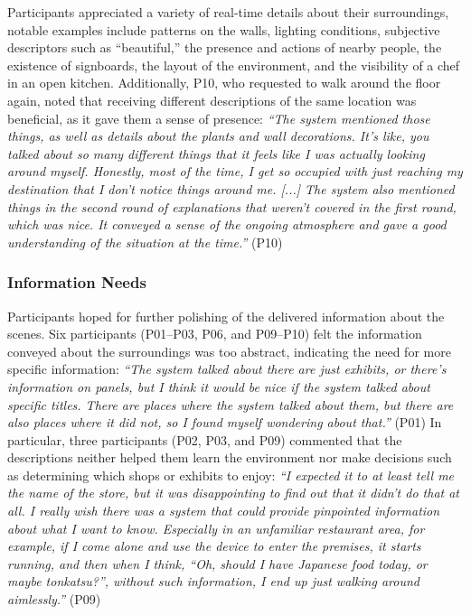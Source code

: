 Participants appreciated a variety of real-time details about their surroundings, notable examples include patterns on the walls, lighting conditions, subjective descriptors such as ``beautiful,'' the presence and actions of nearby people, the existence of signboards, the layout of the environment, and the visibility of a chef in an open kitchen. 
Additionally, P10, who requested to walk around the floor again, noted that receiving different descriptions of the same location was beneficial, as it gave them a sense of presence:
\newanswer[\label{P10VariousAndDifferentInformation}]\textit{``The system mentioned those things, as well as details about the plants and wall decorations. It's like, you talked about so many different things that it feels like I was actually looking around myself. Honestly, most of the time, I get so occupied with just reaching my destination that I don't notice things around me. [...] The system also mentioned things in the second round of explanations that weren't covered in the first round, which was nice. It conveyed a sense of the ongoing atmosphere and gave a good understanding of the situation at the time.''} (P10)

\subsubsection{Information Needs}
\label{sec:info_needs}
Participants hoped for further polishing of the delivered information about the scenes. Six participants (P01--P03, P06, and P09--P10) felt the information conveyed about the surroundings was too abstract, indicating the need for more specific information:
\newanswer[\label{P01NeedMoreConcreteInformation}]\textit{``The system talked about there are just exhibits, or there's information on panels, but I think it would be nice if the system talked about specific titles. There are places where the system talked about them, but there are also places where it did not, so I found myself wondering about that.''} (P01)
In particular, three participants (P02, P03, and P09) commented that the descriptions neither helped them learn the environment nor make decisions such as determining which shops or exhibits to enjoy:
\newanswer[\label{P09NegativeImpression}]\textit{``I expected it to at least tell me the name of the store, but it was disappointing to find out that it didn't do that at all. I really wish there was a system that could provide pinpointed information about what I want to know. Especially in an unfamiliar restaurant area, for example, if I come alone and use the device to enter the premises, it starts running, and then when I think, ``Oh, should I have Japanese food today, or maybe tonkatsu?'', without such information, I end up just walking around aimlessly.''} (P09)

